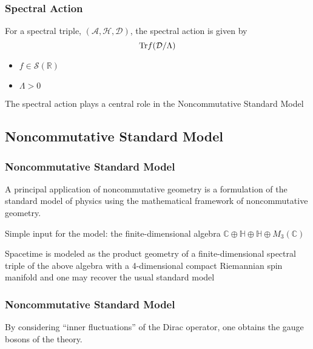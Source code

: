\documentclass{beamer}
\def\C{{\mathbb C}}
\renewcommand{\H}{{\mathbb H}}
\def\R{{\mathbb R}}
\def\cA{{\mathcal A}}
\def\cD{{\mathcal D}}
\def\cH{{\mathcal H}}
\def\Tr{{\rm Tr}}
\begin{document}
\begin{frame}
	\frametitle{Spectral Action}

	\begin{block}{}
		For a spectral triple, $(\cA, \cH, \cD)$, the spectral action is given by
		\[
		\Tr f(\cD / \Lambda)
		\]
	\end{block}

	\pause

	\begin{itemize}
		\item $f \in \mathcal{S} (\R)$
		\item $\Lambda > 0$
	\end{itemize}

	\pause

	\begin{block}{}
		The spectral action plays a central role in the Noncommutative Standard Model
	\end{block}

\end{frame}


\subsection{Noncommutative Standard Model}

\begin{frame}
	\frametitle{Noncommutative Standard Model}

	\begin{block}{}
		A principal application of noncommutative geometry is a formulation of the standard model of physics using the mathematical framework of noncommutative geometry.
	\end{block}

	\pause

	\begin{block}{}
		Simple input for the model: the finite-dimensional algebra $\C \oplus \H \oplus \H \oplus M_3(\C)$
	\end{block}

	\pause

	\begin{block}{}
		Spacetime is modeled as the product geometry of a finite-dimensional spectral triple of the above algebra with a 4-dimensional compact Riemannian spin manifold and one may recover the usual standard model
	\end{block}

\end{frame}


\begin{frame}
	\frametitle{Noncommutative Standard Model}
	\begin{block}{}
		By considering ``inner fluctuations'' of the Dirac operator, one obtains the gauge bosons of the theory.
	\end{block}
\end{frame}
\end{document}
